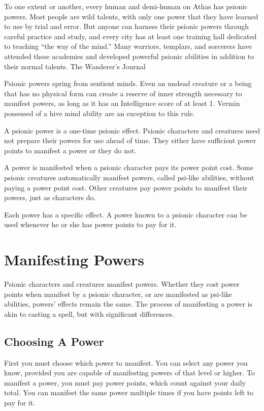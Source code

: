 {To one extent or another, every human and demi-human on Athas has psionic powers. Most people are wild talents, with only one power that they have learned to use by trial and error. But anyone can harness their psionic powers through careful practice and study, and every city has at least one training hall dedicated to teaching ``the way of the mind.'' Many warriors, templars, and sorcerers have attended these academies and developed powerful psionic abilities in addition to their normal talents. }
{The Wanderer's Journal}

Psionic powers spring from sentient minds. Even an undead creature or a being that has no physical form can create a reserve of inner strength necessary to manifest powers, as long as it has an Intelligence score of at least 1. Vermin possessed of a hive mind ability are an exception to this rule.

A psionic power is a one-time psionic effect. Psionic characters and creatures need not prepare their powers for use ahead of time. They either have sufficient power points to manifest a power or they do not.

A power is manifested when a psionic character pays its power point cost. Some psionic creatures automatically manifest powers, called psi-like abilities, without paying a power point cost. Other creatures pay power points to manifest their powers, just as characters do.

Each power has a specific effect. A power known to a psionic character can be used whenever he or she has power points to pay for it.

\section{Manifesting Powers}
Psionic characters and creatures manifest powers. Whether they cost power points when manifest by a psionic character, or are manifested as psi-like abilities, powers' effects remain the same. The process of manifesting a power is akin to casting a spell, but with significant differences.

\subsection{Choosing A Power}
First you must choose which power to manifest. You can select any power you know, provided you are capable of manifesting powers of that level or higher. To manifest a power, you must pay power points, which count against your daily total. You can manifest the same power multiple times if you have points left to pay for it.

